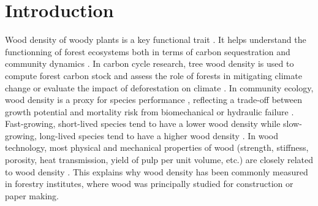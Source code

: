 \documentclass[a4paper, 12pt, leqno, dvipsnames]{article}\usepackage[]{graphicx}\usepackage[]{color}
\begin{document}
\newpage
\doublespacing

\section{Introduction}


Wood density of woody plants is a key functional trait \citep{Violle2007, Chave2009}. It helps understand the functionning of forest ecosystems both in terms of carbon sequestration \citep{Chave2005, Vieilledent2012} and community dynamics \citep{Westoby2006, Kunstler2016, Diaz2016}. In carbon cycle research, tree wood density is used to compute forest carbon stock and assess the role of forests in mitigating climate change \citep{Pan2011, Vieilledent2016} or evaluate the impact of deforestation on climate \citep{Achard2014}. In community ecology, wood density is a proxy for species performance \citep{Lachenbruch2014}, reflecting a trade-off between growth potential and mortality risk from biomechanical or hydraulic failure \citep{Diaz2016}. Fast-growing, short-lived species tend to have a lower wood density while slow-growing, long-lived species tend to have a higher wood density \citep{Chave2009, Greenwood2017}. In wood technology, most physical and mechanical properties of wood (strength, stiffness, porosity, heat transmission, yield of pulp per unit volume, etc.) are closely related to wood density \citep{Sallenave1955, Thibaut2001, Shmulsky2011}. This explains why wood density has been commonly measured in forestry institutes, where wood was principally studied for construction or paper making.

\end{document}
